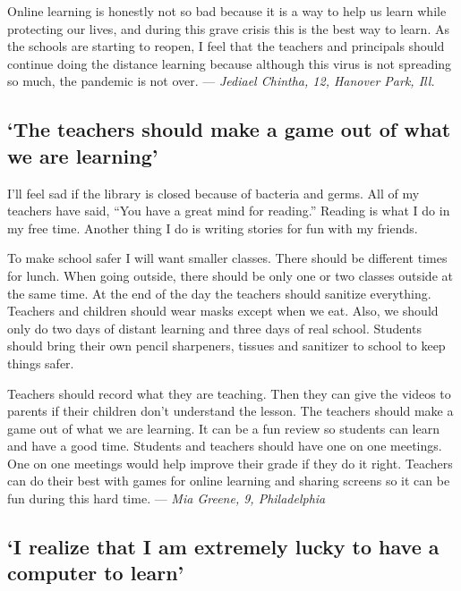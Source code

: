 Online learning is honestly not so bad because it is a way to help us
learn while protecting our lives, and during this grave crisis this is
the best way to learn. As the schools are starting to reopen, I feel
that the teachers and principals should continue doing the distance
learning because although this virus is not spreading so much, the
pandemic is not over. --- \emph{Jediael Chintha, 12, Hanover Park, Ill.}

\hypertarget{the-teachers-should-make-a-game-out-of-what-we-are-learning}{%
\subsection{`The teachers should make a game out of what we are
learning'}\label{the-teachers-should-make-a-game-out-of-what-we-are-learning}}

I'll feel sad if the library is closed because of bacteria and germs.
All of my teachers have said, ``You have a great mind for reading.''
Reading is what I do in my free time. Another thing I do is writing
stories for fun with my friends.

To make school safer I will want smaller classes. There should be
different times for lunch. When going outside, there should be only one
or two classes outside at the same time. At the end of the day the
teachers should sanitize everything. Teachers and children should wear
masks except when we eat. Also, we should only do two days of distant
learning and three days of real school. Students should bring their own
pencil sharpeners, tissues and sanitizer to school to keep things safer.

Teachers should record what they are teaching. Then they can give the
videos to parents if their children don't understand the lesson. The
teachers should make a game out of what we are learning. It can be a fun
review so students can learn and have a good time. Students and teachers
should have one on one meetings. One on one meetings would help improve
their grade if they do it right. Teachers can do their best with games
for online learning and sharing screens so it can be fun during this
hard time. --- \emph{Mia Greene, 9, Philadelphia}

\hypertarget{i-realize-that-i-am-extremely-lucky-to-have-a-computer-to-learn}{%
\subsection{`I realize that I am extremely lucky to have a computer to
learn'}\label{i-realize-that-i-am-extremely-lucky-to-have-a-computer-to-learn}}

